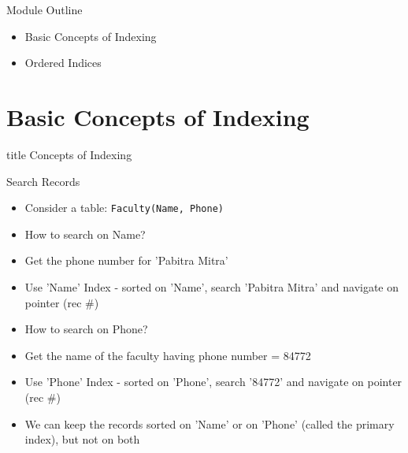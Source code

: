 \documentclass[aspectratio=169, xcolor=dvipsnames]{beamer}
\begin{document}
\begin{frame}{Module Outline}
    \begin{block}{}
        \begin{itemize}[<+->]
            \item Basic Concepts of Indexing
            \item Ordered Indices
        \end{itemize}
    \end{block}
\end{frame}

\section{Basic Concepts of Indexing}
\begin{frame}
  \vfill
  \centering
  \begin{beamercolorbox}[sep=8pt,center,shadow=true,rounded=true]{title}
    Concepts of Indexing\par%
  \end{beamercolorbox}
  \vfill
\end{frame}

\begin{frame}{Search Records}
    \begin{itemize}[<+->]
        \item Consider a table: \texttt{Faculty(Name, Phone)}
        \item How to search on Name?
        \item Get the phone number for 'Pabitra Mitra'
        \item Use 'Name' Index - sorted on 'Name', search 'Pabitra Mitra' and navigate on pointer (rec \#)
        \item How to search on Phone?
        \item Get the name of the faculty having phone number = 84772
        \item Use 'Phone' Index - sorted on 'Phone', search '84772' and navigate on pointer (rec \#)
        \item We can keep the records sorted on 'Name' or on 'Phone' (called the primary index), but not on both
    \end{itemize}
\end{frame}
\end{document}
